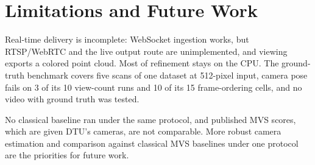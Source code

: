 \documentclass[conference]{IEEEtran}
\begin{document}
\section{Limitations and Future Work}
\label{sec:future-work}

Real-time delivery is incomplete: WebSocket ingestion works, but RTSP/WebRTC and
the live output route are unimplemented, and viewing exports a colored point
cloud. Most of refinement stays on the CPU. The ground-truth benchmark covers five
scans of one dataset at 512-pixel input, camera pose fails on 3 of its 10
view-count runs and 10 of its 15 frame-ordering cells, and no video with ground
truth was tested. 

No classical baseline ran under the same protocol, and published MVS scores, which
are given DTU's cameras, are not comparable. More robust camera estimation and
comparison against classical MVS baselines under one protocol are the priorities
for future work.
\end{document}
